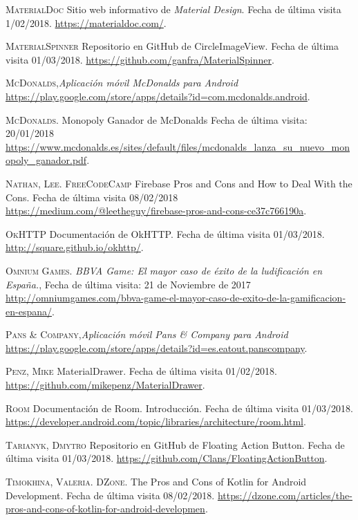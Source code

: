 \documentclass[twoside]{report}
\begin{document}
\begin{thebibliography}{a}
 \textsc{MaterialDoc} 
Sitio web informativo de \textit{Material Design}. Fecha de última visita 1/02/2018. \url{https://materialdoc.com/}.

 \textsc{MaterialSpinner} 
Repositorio en GitHub de CircleImageView. Fecha de última visita 01/03/2018. \url{https://github.com/ganfra/MaterialSpinner}.

 \textsc{McDonalds},\textit{Aplicación móvil McDonalds para Android} \url{https://play.google.com/store/apps/details?id=com.mcdonalds.android}.

 \textsc{McDonalds}. Monopoly Ganador de McDonalds Fecha de última visita: 20/01/2018 \url{https://www.mcdonalds.es/sites/default/files/mcdonalds_lanza_su_nuevo_monopoly_ganador.pdf}.

 \textsc{Nathan, Lee. FreeCodeCamp} Firebase Pros and Cons and How to Deal With the Cons. Fecha de última visita 08/02/2018 \url{https://medium.com/@leetheguy/firebase-pros-and-cons-ce37c766190a}.

 \textsc{OkHTTP} 
Documentación de OkHTTP. Fecha de última visita 01/03/2018. \url{http://square.github.io/okhttp/}.

 \textsc{Omnium Games.} \textit{BBVA Game: El mayor caso de éxito de la ludificación en España.}, Fecha de última visita: 21 de Noviembre de 2017 \url{http://omniumgames.com/bbva-game-el-mayor-caso-de-exito-de-la-gamificacion-en-espana/}. 

 \textsc{Pans \& Company},\textit{Aplicación móvil Pans \& Company para Android} \url{https://play.google.com/store/apps/details?id=es.eatout.panscompany}.

 \textsc{Penz, Mike} MaterialDrawer. Fecha de última visita 01/02/2018. \url{https://github.com/mikepenz/MaterialDrawer}.

 \textsc{Room} 
Documentación de Room. Introducción. Fecha de última visita 01/03/2018. \url{https://developer.android.com/topic/libraries/architecture/room.html}.

 \textsc{Tarianyk, Dmytro} 
Repositorio en GitHub de Floating Action Button. Fecha de última visita 01/03/2018. \url{https://github.com/Clans/FloatingActionButton}.

 \textsc{Timokhina, Valeria. DZone}. The Pros and Cons of Kotlin for Android Development. Fecha de última visita 08/02/2018. \url{https://dzone.com/articles/the-pros-and-cons-of-kotlin-for-android-developmen}.


\end{thebibliography}
\end{document}
